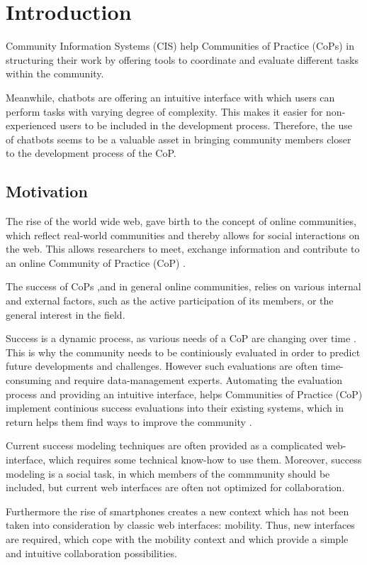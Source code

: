\chapter{Introduction}
Community Information Systems (CIS) help Communities of Practice (CoPs) in structuring their work by offering tools to coordinate and evaluate different tasks within the community\cite{Klam10c}.

Meanwhile, chatbots are offering an intuitive interface with which users can perform tasks with varying degree of complexity. This makes it easier for non-experienced users to be included in the development process. Therefore, the use of chatbots seems to be a valuable asset in bringing community members closer to the development process of the CoP.

\section{Motivation}
The rise of the world wide web, gave birth to the concept of online communities, which reflect real-world communities and thereby allows for social interactions on the web.
This allows researchers to meet, exchange information and contribute to an online Community of Practice (CoP) \cite{Renz08}.

The success of CoPs ,and in general online communities, relies on various internal and external factors, such as the active participation of its members, or the general interest in the field.

Success is a dynamic process, as various needs of a CoP are changing over time \cite{Renz08,GKJa08}. This is why the community needs to be continiously evaluated in order to predict future developments and challenges. However such evaluations are often time-consuming and require data-management experts. Automating the evaluation process and providing an intuitive interface, helps Communities of Practice (CoP) implement continious success evaluations into their existing systems, which in return helps them find ways to improve the community \cite{Renz08}.

Current success modeling techniques are often provided as a complicated web-interface, which requires some technical know-how to use them. Moreover, success modeling is a social task, in which members of the commmunity should be included, but current web interfaces are often not optimized for collaboration.

Furthermore the rise of smartphones creates a new context which has not been taken into consideration by classic web interfaces: mobility.
Thus, new interfaces are required, which cope with the mobility context and which provide a simple and intuitive collaboration possibilities.
\newpage

